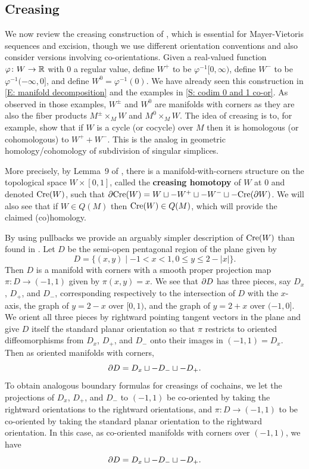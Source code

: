 


\subsection{Creasing}\label{S: creasing}

We now review the creasing construction of \cite[Section 2.4]{Lipy14}, which is essential for Mayer-Vietoris sequences and excision, though we use different orientation conventions and also consider versions involving co-orientations.
Given a real-valued function $\varphi \colon W \to \mathbb{R}$ with $0$ a regular value,
define $W^+$ to be $\varphi^{-1} [0, \infty)$, define $W^-$ to be $\varphi^{-1} (-\infty, 0]$, and define $W^0 = \varphi^{-1}(0)$. We have already seen this construction in \cref{E: manifold decomposition} and the examples in \cref{S: codim 0 and 1 co-or}.
 As observed in those examples, $W^\pm$ and $W^0$
are manifolds with corners as they are also the fiber products $M^\pm \times_M W$ and $M^0 \times_M W$. The idea of creasing is to, for example, show that if $W$ is a cycle (or cocycle) over $M$ then it is homologous (or cohomologous) to $W^++W^-$. This is the analog in geometric homology/cohomology of subdivision of singular simplices.


More precisely, by Lemma~9 of \cite{Lipy14}, there is a manifold-with-corners structure on the topological space $W \times [0,1]$,
called the \textbf{creasing homotopy} of $W$ at $0$ and denoted $\mathrm{Cre}(W)$, such that $\partial \mathrm{Cre}(W) = W\sqcup -W^+\sqcup -W^-\sqcup - \mathrm{Cre}(\partial W)$. We will also see that if $W \in Q(M)$ then $\mathrm{Cre}(W) \in Q(M)$, which will provide the claimed (co)homology.



By using pullbacks we provide an arguably simpler description of $\mathrm{Cre}(W)$ than found in \cite{Lipy14}. Let $D$ be the semi-open pentagonal region of the plane given by $$D = \{(x,y)\mid -1<x<1, 0\leq y\leq 2-|x|\}.$$
Then $D$ is a manifold with corners with a smooth proper projection map $\pi:D \to (-1,1)$ given by $\pi(x,y) = x$. We see that $\partial D$ has three pieces, say $D_x$, $D_+$, and $D_-$, corresponding respectively to the intersection of $D$ with the $x$-axis, the graph of $y = 2-x$ over $[0,1)$, and the graph of $y = 2+x$ over $(-1, 0]$. We orient all three pieces by rightward pointing tangent vectors in the plane and give $D$ itself the standard planar orientation so that $\pi$ restricts to oriented diffeomorphisms from $D_x$, $D_+$, and $D_-$ onto their images in $(-1,1) = D_x$. Then as oriented manifolds with corners, $$\partial D = D_x\sqcup -D_-\sqcup -D_+.$$
To obtain analogous boundary formulas for creasings of cochains, we let the projections of $D_x$, $D_+$, and $D_-$ to $(-1,1)$ be co-oriented by taking the rightward orientations to the rightward orientations, and $\pi:D \to (-1,1)$ to be co-oriented by taking the standard planar orientation to the rightward orientation. In this case, as co-oriented manifolds with corners over $(-1,1)$, we have
 $$\partial D = D_x\sqcup -D_-\sqcup -D_+.$$

